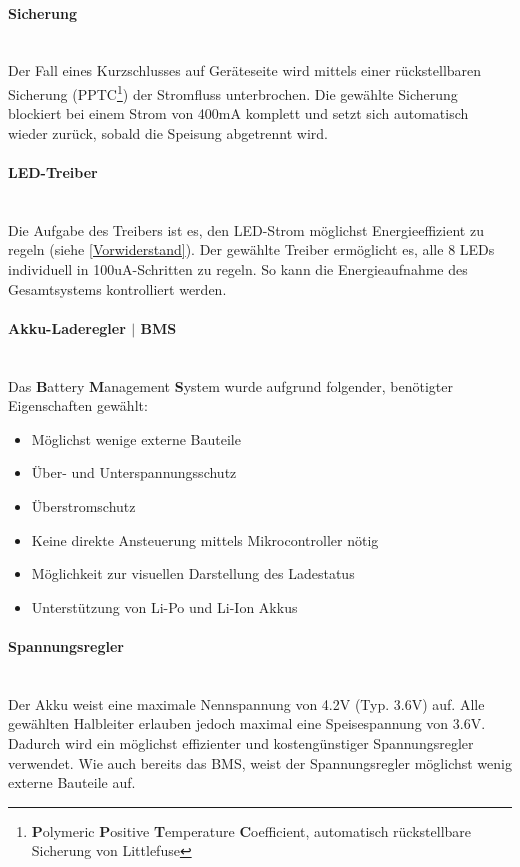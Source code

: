 \documentclass[12pt]{article}
\begin{document}
	\paragraph{Sicherung}\mbox{}\\
	Der Fall eines Kurzschlusses auf Geräteseite wird mittels einer rückstellbaren Sicherung (PPTC\footnote{\textbf{P}olymeric \textbf{P}ositive \textbf{T}emperature \textbf{C}oefficient, automatisch rückstellbare Sicherung von Littlefuse}) der Stromfluss unterbrochen. Die gewählte Sicherung blockiert bei einem Strom von 400mA komplett und setzt sich automatisch wieder zurück, sobald die Speisung abgetrennt wird.
	\paragraph{LED-Treiber} \mbox{}\\
	Die Aufgabe des Treibers ist es, den LED-Strom möglichst Energieeffizient zu regeln (siehe \ref{Vorwiderstand}). Der gewählte Treiber ermöglicht es, alle 8 LEDs individuell in 100uA-Schritten zu regeln. So kann die Energieaufnahme des Gesamtsystems kontrolliert werden.
	\paragraph{Akku-Laderegler $\vert$ BMS} \mbox{}\\
	Das \textbf{B}attery \textbf{M}anagement \textbf{S}ystem wurde aufgrund folgender, benötigter Eigenschaften gewählt:
	\begin{itemize}
		\item Möglichst wenige externe Bauteile
		\item Über- und Unterspannungsschutz
		\item Überstromschutz
		\item Keine direkte Ansteuerung mittels Mikrocontroller nötig
		\item Möglichkeit zur visuellen Darstellung des Ladestatus
		\item Unterstützung von Li-Po und Li-Ion Akkus
	\end{itemize}
	\paragraph{Spannungsregler} \mbox{}\\
	Der Akku weist eine maximale Nennspannung von 4.2V (Typ. 3.6V) auf. Alle gewählten Halbleiter erlauben jedoch maximal eine Speisespannung von 3.6V. Dadurch wird ein möglichst effizienter und kostengünstiger Spannungsregler verwendet. Wie auch bereits das BMS, weist der Spannungsregler möglichst wenig externe Bauteile auf.
\end{document}
